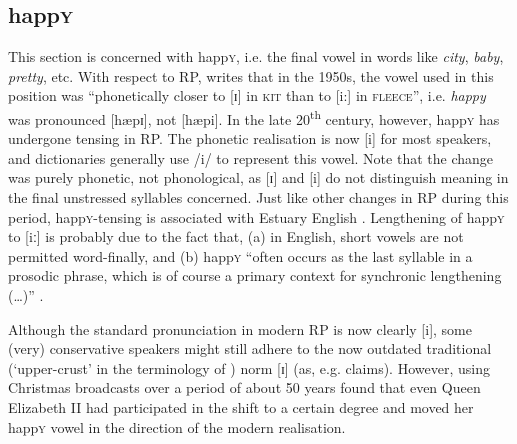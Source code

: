 		\subsection{happ\textsc{y}}\label{sec.var.vow.happy}

This section is concerned with happ\textsc{y}, i.e. the final vowel in words like \emph{city}, \emph{baby}, \emph{pretty}, etc.
With respect to RP, \citet[441]{harrington2006} writes that in the 1950s, the vowel used in this position was ``phonetically closer to [ɪ] in \textsc{kit} than to [i:] in \textsc{fleece}'', i.e. \emph{happy} was pronounced [hæpɪ], not [hæpi].
In the late 20\textsuperscript{th} century, however, happ\textsc{y} has undergone tensing in RP.
The phonetic realisation is now [i] for most speakers, and dictionaries generally use /i/ to represent this vowel.
Note that the change was purely phonetic, not phonological, as [ɪ] and [i] do not distinguish meaning in the final unstressed syllables concerned.
Just like other changes in RP during this period, happ\textsc{y}-tensing is associated with Estuary English \citep[cf.][]{wells1997}.
Lengthening of happ\textsc{y} to [iː] is probably due to the fact that, (a) in English, short vowels are not permitted word-finally, and (b) happ\textsc{y} ``often occurs as the last syllable in a prosodic phrase, which is of course a primary context for synchronic lengthening (\ldots)'' \citep[441]{harrington2006}.

Although the standard pronunciation in modern RP is now clearly [i], some (very) conservative speakers might still adhere to the now outdated traditional (`upper-crust' in the terminology of \citealt{wells1982}) norm [ɪ] (as, e.g. \cite{trudgill1999} claims).
However, using Christmas broadcasts over a period of about 50 years \citet[cf.][452]{harrington2006} found that even Queen Elizabeth II had participated in the shift to a certain degree and moved her happ\textsc{y} vowel in the direction of the modern realisation.

